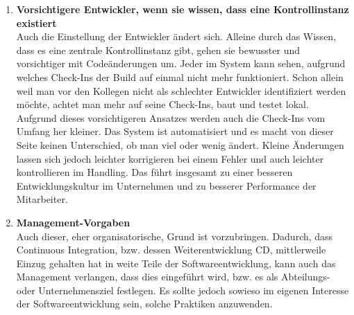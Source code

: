 \begin{enumerate}
	\item \textbf{Vorsichtigere Entwickler, wenn sie wissen, dass eine Kontrollinstanz existiert}\\
	Auch die Einstellung der Entwickler ändert sich. Alleine durch das Wissen, dass es eine zentrale Kontrollinstanz gibt, gehen sie bewusster und vorsichtiger mit Codeänderungen um. Jeder im System kann sehen, aufgrund welches Check-Ins der Build auf einmal nicht mehr funktioniert. Schon allein weil man vor den Kollegen nicht als schlechter Entwickler identifiziert werden möchte, achtet man mehr auf seine Check-Ins, baut und testet lokal. Aufgrund dieses vorsichtigeren Ansatzes werden auch die Check-Ins vom Umfang her kleiner. Das System ist automatisiert und es macht von dieser Seite keinen Unterschied, ob man viel oder wenig ändert. Kleine Änderungen lassen sich jedoch leichter korrigieren bei einem Fehler und auch leichter kontrollieren im Handling. Das führt insgesamt zu einer besseren Entwicklungskultur im Unternehmen und zu besserer Performance der Mitarbeiter.
	\item \textbf{Management-Vorgaben}\\
	Auch dieser, eher organisatorische, Grund ist vorzubringen. Dadurch, dass Continuous Integration, bzw. dessen Weiterentwicklung CD, mittlerweile Einzug gehalten hat in weite Teile der Softwareentwicklung, kann auch das Management verlangen, dass dies eingeführt wird, bzw. es als Abteilungs- oder Unternehmensziel festlegen. Es sollte jedoch sowieso im eigenen Interesse der Softwareentwicklung sein, solche Praktiken anzuwenden.
\end{enumerate}
	
